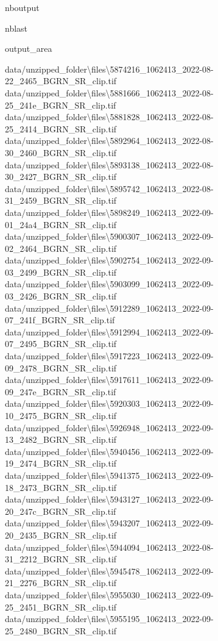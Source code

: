 \documentclass[letterpaper,10pt]{sphinxmanual}
\begin{document}
\begin{sphinxuseclass}{nboutput}
\begin{sphinxuseclass}{nblast}
{\begin{sphinxuseclass}{output_area}
\begin{sphinxuseclass}{}
\begin{sphinxVerbatim}[commandchars=\\\{\}]
data/unzipped\_folder\textbackslash{}files\textbackslash{}5874216\_1062413\_2022-08-22\_2465\_BGRN\_SR\_clip.tif
data/unzipped\_folder\textbackslash{}files\textbackslash{}5881666\_1062413\_2022-08-25\_241e\_BGRN\_SR\_clip.tif
data/unzipped\_folder\textbackslash{}files\textbackslash{}5881828\_1062413\_2022-08-25\_2414\_BGRN\_SR\_clip.tif
data/unzipped\_folder\textbackslash{}files\textbackslash{}5892964\_1062413\_2022-08-30\_2460\_BGRN\_SR\_clip.tif
data/unzipped\_folder\textbackslash{}files\textbackslash{}5893138\_1062413\_2022-08-30\_2427\_BGRN\_SR\_clip.tif
data/unzipped\_folder\textbackslash{}files\textbackslash{}5895742\_1062413\_2022-08-31\_2459\_BGRN\_SR\_clip.tif
data/unzipped\_folder\textbackslash{}files\textbackslash{}5898249\_1062413\_2022-09-01\_24a4\_BGRN\_SR\_clip.tif
data/unzipped\_folder\textbackslash{}files\textbackslash{}5900307\_1062413\_2022-09-02\_2464\_BGRN\_SR\_clip.tif
data/unzipped\_folder\textbackslash{}files\textbackslash{}5902754\_1062413\_2022-09-03\_2499\_BGRN\_SR\_clip.tif
data/unzipped\_folder\textbackslash{}files\textbackslash{}5903099\_1062413\_2022-09-03\_2426\_BGRN\_SR\_clip.tif
data/unzipped\_folder\textbackslash{}files\textbackslash{}5912289\_1062413\_2022-09-07\_241f\_BGRN\_SR\_clip.tif
data/unzipped\_folder\textbackslash{}files\textbackslash{}5912994\_1062413\_2022-09-07\_2495\_BGRN\_SR\_clip.tif
data/unzipped\_folder\textbackslash{}files\textbackslash{}5917223\_1062413\_2022-09-09\_2478\_BGRN\_SR\_clip.tif
data/unzipped\_folder\textbackslash{}files\textbackslash{}5917611\_1062413\_2022-09-09\_247e\_BGRN\_SR\_clip.tif
data/unzipped\_folder\textbackslash{}files\textbackslash{}5920303\_1062413\_2022-09-10\_2475\_BGRN\_SR\_clip.tif
data/unzipped\_folder\textbackslash{}files\textbackslash{}5926948\_1062413\_2022-09-13\_2482\_BGRN\_SR\_clip.tif
data/unzipped\_folder\textbackslash{}files\textbackslash{}5940456\_1062413\_2022-09-19\_2474\_BGRN\_SR\_clip.tif
data/unzipped\_folder\textbackslash{}files\textbackslash{}5941375\_1062413\_2022-09-18\_2473\_BGRN\_SR\_clip.tif
data/unzipped\_folder\textbackslash{}files\textbackslash{}5943127\_1062413\_2022-09-20\_247c\_BGRN\_SR\_clip.tif
data/unzipped\_folder\textbackslash{}files\textbackslash{}5943207\_1062413\_2022-09-20\_2435\_BGRN\_SR\_clip.tif
data/unzipped\_folder\textbackslash{}files\textbackslash{}5944094\_1062413\_2022-08-31\_2212\_BGRN\_SR\_clip.tif
data/unzipped\_folder\textbackslash{}files\textbackslash{}5945478\_1062413\_2022-09-21\_2276\_BGRN\_SR\_clip.tif
data/unzipped\_folder\textbackslash{}files\textbackslash{}5955030\_1062413\_2022-09-25\_2451\_BGRN\_SR\_clip.tif
data/unzipped\_folder\textbackslash{}files\textbackslash{}5955195\_1062413\_2022-09-25\_2480\_BGRN\_SR\_clip.tif

\end{sphinxVerbatim}
\end{sphinxuseclass}
\end{sphinxuseclass}}
\end{sphinxuseclass}
\end{sphinxuseclass}
\end{document}
